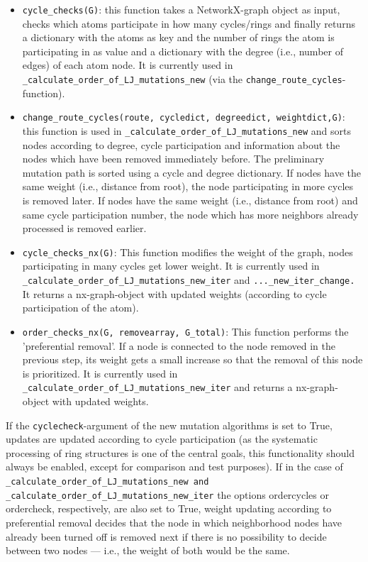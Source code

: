 \begin{itemize}
\item \texttt{cycle\_checks(G)}: this function takes a NetworkX-graph object as input, checks which atoms participate
in how many cycles/rings and finally returns a dictionary with the atoms as
key and the number of rings the atom is participating in as value
and a dictionary with the degree (i.e., number of edges) of each atom
node. It is currently used in \texttt{\_calculate\_order\_of\_LJ\_mutations\_new}
(via the \texttt{change\_route\_cycles}-function).

\item \begin{sloppypar}\texttt{change\_route\_cycles\string(route, cycledict, degreedict, weightdict,G\string)}: this function is used in \texttt{\_calculate\_order\_of\_LJ\_mutations\_new}
and sorts nodes according to degree, cycle participation and information
about the nodes which have been removed immediately before. The preliminary mutation
path is sorted using a cycle and degree dictionary. If nodes have the same
weight (i.e., distance from root), the node participating in more cycles
is removed later. If nodes have the same weight (i.e., distance from root)
and same cycle participation number, the node which has more neighbors
already processed is removed earlier.\end{sloppypar}

\item \texttt{cycle\_checks\_nx(G)}: This function modifies the weight of
the graph, nodes participating in many cycles get lower weight. It
is currently used in 
\texttt{\_calculate\_order\_of\_LJ\_mutations\_new\_iter} and \texttt{...\_new\_iter\_change.} It returns a nx-graph-object
with updated weights (according to cycle participation of the atom).

\item \texttt{order\_checks\_nx(G, removearray, G\_total)}: This function
performs the 'preferential removal'. If a node is connected to the
node removed in the previous step, its weight gets a small increase so
that the removal of this node is prioritized. It is currently used
in\texttt{ \_calculate\_order\_of\_LJ\_mutations\_new\_iter} and returns
a nx-graph-object with updated weights.
\end{itemize}

If the \texttt{cyclecheck}-argument of the new mutation algorithms is set to True,
updates are updated according to cycle participation (as the systematic
processing of ring structures is one of the central goals, this functionality
should always be enabled, except for comparison and test purposes).
If in the case of \texttt{\_calculate\_order\_of\_LJ\_mutations\_new
and \_calculate\_order\_of\_LJ\_mutations\_new\_iter} the options  ordercycles
or ordercheck, respectively, are also set to True, weight updating according
to preferential removal decides that the node in which neighborhood
nodes have already been turned off is removed next if there is no
possibility to decide between two nodes --- i.e., the weight of both
would be the same.


